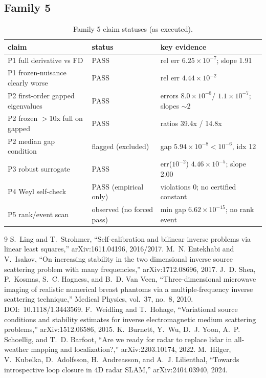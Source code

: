 \documentclass[12pt]{article}
\begin{document}
\subsection{Family 5}
\begin{table}[ht]
\centering
\small
\caption{Family 5 claim statuses (as executed).}
\label{app:tab:f5}
\begin{tabular}{p{} p{} p{}}
\toprule
claim & status & key evidence \\
\midrule
P1 full derivative vs FD & PASS & rel err $6.25\times10^{-7}$; slope 1.91 \\
P1 frozen-nuisance clearly worse & PASS & rel err $4.44\times10^{-2}$ \\
P2 first-order gapped eigenvalues & PASS &
errors $8.0\times10^{-8}$/ $1.1\times10^{-7}$; slopes $\sim2$ \\
P2 frozen $>$10x full on gapped & PASS & ratios 39.4x / 14.8x \\
P2 median gap condition & flagged (excluded) &
gap $5.94\times10^{-8}<10^{-6}$, idx 12 \\
P3 robust surrogate & PASS &
err($10^{-2}$) $4.46\times10^{-5}$; slope 2.00 \\
P4 Weyl self-check & PASS (empirical only) &
violations 0; no certified constant \\
P5 rank/event scan & observed (no forced pass) &
min gap $6.62\times10^{-15}$; no rank event \\
\bottomrule
\end{tabular}
\end{table}

\begin{thebibliography}{9}
 S.~Ling and T.~Strohmer, ``Self-calibration and bilinear
inverse problems via linear least squares,'' arXiv:1611.04196, 2016/2017.
 M.~N. Entekhabi and V.~Isakov, ``On increasing stability
in the two dimensional inverse source scattering problem with many
frequencies,'' arXiv:1712.08696, 2017.
 J.~D. Shea, P.~Kosmas, S.~C. Hagness, and B.~D. Van Veen,
``Three-dimensional microwave imaging of realistic numerical breast phantoms
via a multiple-frequency inverse scattering technique,'' Medical Physics,
vol.~37, no.~8, 2010. DOI:~10.1118/1.3443569.
 F.~Weidling and T.~Hohage, ``Variational source conditions
and stability estimates for inverse electromagnetic medium scattering
problems,'' arXiv:1512.06586, 2015.
 K.~Burnett, Y.~Wu, D.~J. Yoon, A.~P. Schoellig, and
T.~D. Barfoot, ``Are we ready for radar to replace lidar in all-weather
mapping and localization?,'' arXiv:2203.10174, 2022.
 M.~Hilger, V.~Kubelka, D.~Adolfsson, H.~Andreasson, and
A.~J. Lilienthal, ``Towards introspective loop closure in 4D radar SLAM,''
arXiv:2404.03940, 2024.
\end{thebibliography}
\end{document}
